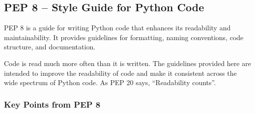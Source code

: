 \newpage
\subsection{PEP 8 – Style Guide for Python Code}

PEP 8 is a guide for writing Python code that enhances its readability and maintainability. It provides guidelines for formatting, naming conventions, code structure, and documentation.

Code is read much more often than it is written. The guidelines provided here are intended to improve the readability of code and make it consistent across the wide spectrum of Python code. As PEP 20 says, “Readability counts”.\\

\subsubsection{Key Points from PEP 8}

